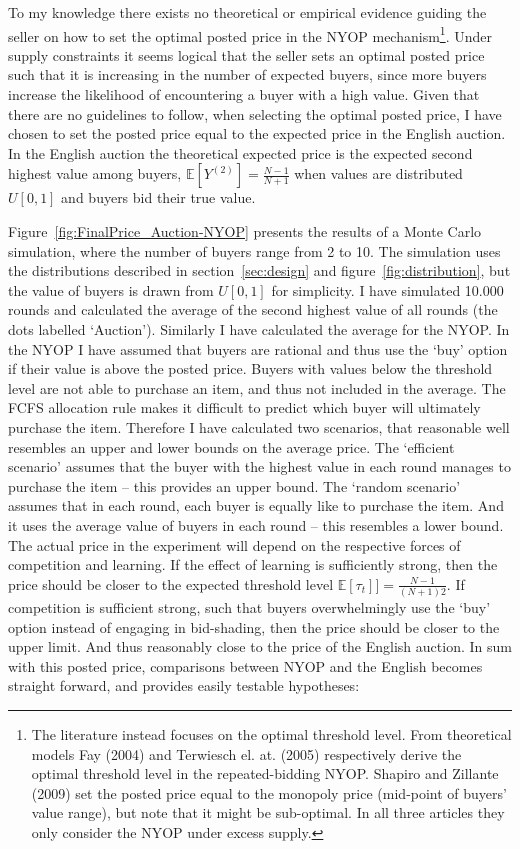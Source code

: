 \documentclass[a4paper,12pt]{article}
\begin{document}
	 To my knowledge there exists no theoretical or empirical evidence guiding the seller on how to set the optimal posted price in the NYOP mechanism\footnote{The literature instead focuses on the optimal threshold level. From theoretical models Fay (2004) and Terwiesch el. at. (2005) respectively derive the optimal threshold level in the repeated-bidding NYOP. Shapiro and Zillante (2009) set the posted price equal to the monopoly price (mid-point of buyers' value range), but note that it might be sub-optimal. In all three articles they only consider the NYOP under excess supply.}. Under supply constraints it seems logical that the seller sets an optimal posted price such that it is increasing in the number of expected buyers, since more buyers increase the likelihood of encountering a buyer with a high value. Given that there are no guidelines to follow, when selecting the optimal posted price, I have chosen to set the posted price equal to the expected price in the English auction. In the English auction the theoretical expected price is the expected second highest value among buyers, $\mathbb{E}[Y^{(2)}] = \frac{N-1}{N+1}$ when values are distributed $U[0,1]$ and buyers bid their true value.

	Figure~\ref{fig:FinalPrice_Auction-NYOP} presents the results of a Monte Carlo simulation, where the number of buyers range from 2 to 10. The simulation uses the distributions described in section~\ref{sec:design} and figure~\ref{fig:distribution}, but the value of buyers is drawn from $U[0,1]$ for simplicity. I have simulated 10.000 rounds and calculated the average of the second highest value of all rounds (the dots labelled `Auction'). Similarly I have calculated the average for the NYOP. In the NYOP I have assumed that buyers are rational and thus use the `buy' option if their value is above the posted price. Buyers with values below the threshold level are not able to purchase an item, and thus not included in the average. The FCFS allocation rule makes it difficult to predict which buyer will ultimately purchase the item. Therefore I have calculated two scenarios, that reasonable well resembles an upper and lower bounds on the average price. The `efficient scenario' assumes that the buyer with the highest value in each round manages to purchase the item -- this provides an upper bound. The `random scenario' assumes that in each round, each buyer is equally like to purchase the item. And it uses the average value of buyers in each round -- this resembles a lower bound. The actual price in the experiment will depend on the respective forces of competition and learning. If the effect of learning is sufficiently strong, then the price should be closer to the expected threshold level $\mathbb{E}[\tau_t]] = \frac{N-1}{(N+1)2}$. If competition is sufficient strong, such that buyers overwhelmingly use the `buy' option instead of engaging in bid-shading, then the price should be closer to the upper limit. And thus reasonably close to the price of the English auction. In sum with this posted price, comparisons between NYOP and the English becomes straight forward, and provides easily testable hypotheses:
\end{document}
